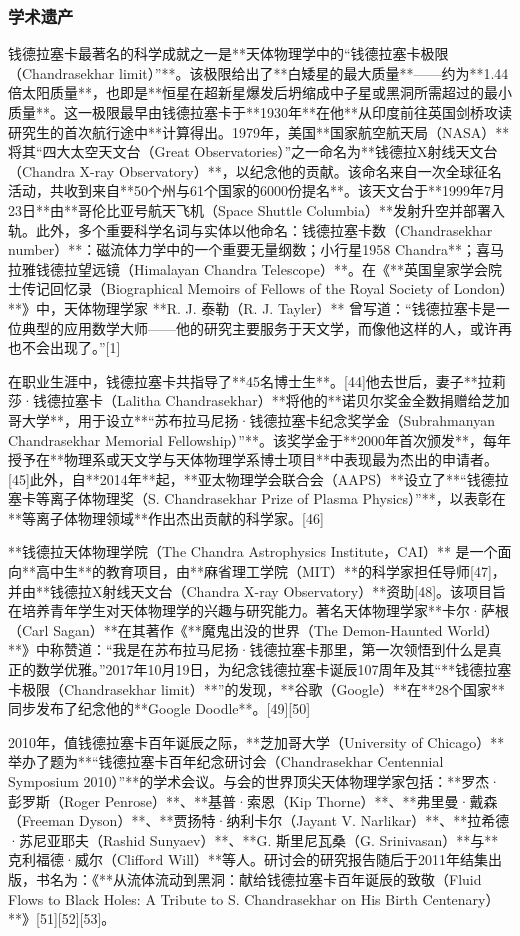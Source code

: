\subsubsection{学术遗产}
钱德拉塞卡最著名的科学成就之一是**天体物理学中的“钱德拉塞卡极限（Chandrasekhar limit）”**。该极限给出了**白矮星的最大质量**——约为**1.44倍太阳质量**，也即是**恒星在超新星爆发后坍缩成中子星或黑洞所需超过的最小质量**。这一极限最早由钱德拉塞卡于**1930年**在他**从印度前往英国剑桥攻读研究生的首次航行途中**计算得出。1979年，美国**国家航空航天局（NASA）**将其“四大太空天文台（Great Observatories）”之一命名为**钱德拉X射线天文台（Chandra X-ray Observatory）**，以纪念他的贡献。该命名来自一次全球征名活动，共收到来自**50个州与61个国家的6000份提名**。该天文台于**1999年7月23日**由**哥伦比亚号航天飞机（Space Shuttle Columbia）**发射升空并部署入轨。此外，多个重要科学名词与实体以他命名：钱德拉塞卡数（Chandrasekhar number）**：磁流体力学中的一个重要无量纲数；小行星1958 Chandra**；喜马拉雅钱德拉望远镜（Himalayan Chandra Telescope）**。在《**英国皇家学会院士传记回忆录（Biographical Memoirs of Fellows of the Royal Society of London）**》中，天体物理学家 **R. J. 泰勒（R. J. Tayler）** 曾写道：“钱德拉塞卡是一位典型的应用数学大师——他的研究主要服务于天文学，而像他这样的人，或许再也不会出现了。”[1]

在职业生涯中，钱德拉塞卡共指导了**45名博士生**。[44]他去世后，妻子**拉莉莎·钱德拉塞卡（Lalitha Chandrasekhar）**将他的**诺贝尔奖金全数捐赠给芝加哥大学**，用于设立**“苏布拉马尼扬·钱德拉塞卡纪念奖学金（Subrahmanyan Chandrasekhar Memorial Fellowship）”**。该奖学金于**2000年首次颁发**，每年授予在**物理系或天文学与天体物理学系博士项目**中表现最为杰出的申请者。[45]此外，自**2014年**起，**亚太物理学会联合会（AAPS）**设立了**“钱德拉塞卡等离子体物理奖（S. Chandrasekhar Prize of Plasma Physics）”**，以表彰在**等离子体物理领域**作出杰出贡献的科学家。[46]

**钱德拉天体物理学院（The Chandra Astrophysics Institute，CAI）** 是一个面向**高中生**的教育项目，由**麻省理工学院（MIT）**的科学家担任导师[47]，并由**钱德拉X射线天文台（Chandra X-ray Observatory）**资助[48]。该项目旨在培养青年学生对天体物理学的兴趣与研究能力。著名天体物理学家**卡尔·萨根（Carl Sagan）**在其著作《**魔鬼出没的世界（The Demon-Haunted World）**》中称赞道：“我是在苏布拉马尼扬·钱德拉塞卡那里，第一次领悟到什么是真正的数学优雅。”2017年10月19日，为纪念钱德拉塞卡诞辰107周年及其“**钱德拉塞卡极限（Chandrasekhar limit）**”的发现，**谷歌（Google）**在**28个国家**同步发布了纪念他的**Google Doodle**。[49][50]

2010年，值钱德拉塞卡百年诞辰之际，**芝加哥大学（University of Chicago）**举办了题为**“钱德拉塞卡百年纪念研讨会（Chandrasekhar Centennial Symposium 2010）”**的学术会议。与会的世界顶尖天体物理学家包括：**罗杰·彭罗斯（Roger Penrose）**、**基普·索恩（Kip Thorne）**、**弗里曼·戴森（Freeman Dyson）**、**贾扬特·纳利卡尔（Jayant V. Narlikar）**、**拉希德·苏尼亚耶夫（Rashid Sunyaev）**、**G. 斯里尼瓦桑（G. Srinivasan）**与**克利福德·威尔（Clifford Will）**等人。研讨会的研究报告随后于2011年结集出版，书名为：《**从流体流动到黑洞：献给钱德拉塞卡百年诞辰的致敬（Fluid Flows to Black Holes: A Tribute to S. Chandrasekhar on His Birth Centenary）**》[51][52][53]。
